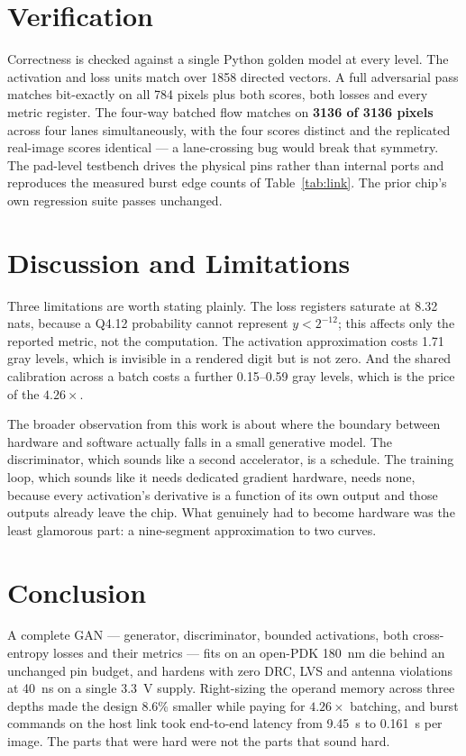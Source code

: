 \documentclass[conference,a4paper]{APSIPA2026}
\begin{document}
\section{Verification}
Correctness is checked against a single Python golden model at every level. The activation and loss units match over 1858 directed vectors. A full adversarial pass matches bit-exactly on all 784 pixels plus both scores, both losses and every metric register. The four-way batched flow matches on \textbf{3136 of 3136 pixels} across four lanes simultaneously, with the four scores distinct and the replicated real-image scores identical --- a lane-crossing bug would break that symmetry. The pad-level testbench drives the physical pins rather than internal ports and reproduces the measured burst edge counts of Table~\ref{tab:link}. The prior chip's own regression suite passes unchanged.

\section{Discussion and Limitations}
Three limitations are worth stating plainly. The loss registers saturate at 8.32 nats, because a Q4.12 probability cannot represent $y < 2^{-12}$; this affects only the reported metric, not the computation. The activation approximation costs 1.71 gray levels, which is invisible in a rendered digit but is not zero. And the shared calibration across a batch costs a further 0.15--0.59 gray levels, which is the price of the $4.26\times$.

The broader observation from this work is about where the boundary between hardware and software actually falls in a small generative model. The discriminator, which sounds like a second accelerator, is a schedule. The training loop, which sounds like it needs dedicated gradient hardware, needs none, because every activation's derivative is a function of its own output and those outputs already leave the chip. What genuinely had to become hardware was the least glamorous part: a nine-segment approximation to two curves.

\section{Conclusion}
A complete GAN --- generator, discriminator, bounded activations, both cross-entropy losses and their metrics --- fits on an open-PDK 180~nm die behind an unchanged pin budget, and hardens with zero DRC, LVS and antenna violations at 40~ns on a single 3.3~V supply. Right-sizing the operand memory across three depths made the design 8.6\% smaller while paying for $4.26\times$ batching, and burst commands on the host link took end-to-end latency from 9.45~s to 0.161~s per image. The parts that were hard were not the parts that sound hard.
\end{document}
